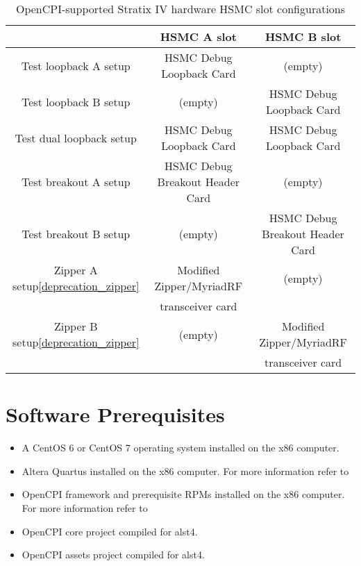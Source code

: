 \documentclass{article}
\begin{document}
\begin{center}
        \begin{table}[!htbp]
        \centering
        \caption{OpenCPI-supported Stratix IV hardware HSMC slot configurations}
        \label{table:supported_slots}
        \begin{tabular}{c|c|c|}
                \cline{2-3}
                & HSMC A slot & HSMC B slot \\ \hline
                \multicolumn{1}{|c|}{Test loopback A setup} & HSMC Debug Loopback Card & (empty)\\ \hline
                \multicolumn{1}{|c|}{Test loopback B setup} & (empty) & HSMC Debug Loopback Card \\ \hline
                \multicolumn{1}{|c|}{Test dual loopback setup} & HSMC Debug Loopback Card & HSMC Debug Loopback Card \\ \hline
                \multicolumn{1}{|c|}{Test breakout A setup} & HSMC Debug Breakout Header Card & (empty)\\ \hline
                \multicolumn{1}{|c|}{Test breakout B setup} & (empty) & HSMC Debug Breakout Header Card \\ \hline
                \multicolumn{1}{|c|}{Zipper A setup\ref{deprecation_zipper}} & Modified\cite{zipper_mods} Zipper/MyriadRF & (empty)\\
                \multicolumn{1}{|c|}{ } & transceiver card & \\ \hline
                \multicolumn{1}{|c|}{Zipper B setup\ref{deprecation_zipper}} & (empty) & Modified\cite{zipper_mods} Zipper/MyriadRF \\
                \multicolumn{1}{|c|}{ } & & transceiver card \\ \hline
        \end{tabular}
        \end{table}
\end{center}

\section{Software Prerequisites}
\begin{itemize}
\item A CentOS 6 or CentOS 7 operating system installed on the x86 computer.
\item Altera Quartus installed on the x86 computer. For more information refer to \cite{fpga_vendor_tool_guide}
\item OpenCPI framework and prerequisite RPMs installed on the x86 computer. For more information refer to \cite{rpm_installation_guide}
\item OpenCPI core project compiled for alst4.
\item OpenCPI assets project compiled for alst4.
\end{itemize}
\end{document}
